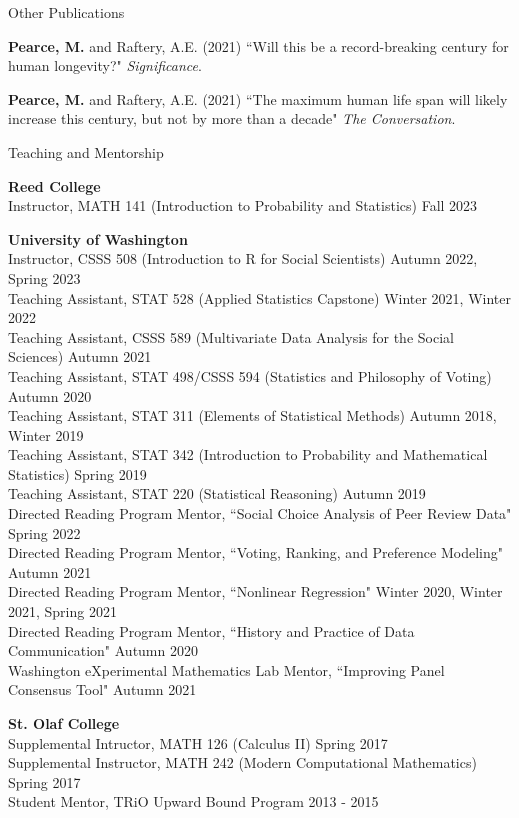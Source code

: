 \documentclass{resume} %
\begin{document}
\begin{rSection}{Other Publications}

\textbf{Pearce, M.} and Raftery, A.E. (2021) ``Will this be a record-breaking century for human longevity?" {\em Significance}.

\textbf{Pearce, M.} and Raftery, A.E. (2021) ``The maximum human life span will likely increase this century, but not by more than a decade" {\em The Conversation}.

\end{rSection}


\begin{rSection}{Teaching and Mentorship}

\textbf{Reed College}
\\ Instructor, MATH 141 (Introduction to Probability and Statistics) \hfill {Fall 2023}

\textbf{University of Washington}
\\ Instructor, CSSS 508 (Introduction to R for Social Scientists) \hfill {Autumn 2022, Spring 2023}
\\ Teaching Assistant, STAT 528 (Applied Statistics Capstone) \hfill {Winter 2021, Winter 2022}
\\ Teaching Assistant, CSSS 589 (Multivariate Data Analysis for the Social Sciences) \hfill Autumn 2021
\\ Teaching Assistant, STAT 498/CSSS 594 (Statistics and Philosophy of Voting) \hfill Autumn 2020
\\ Teaching Assistant, STAT 311 (Elements of Statistical Methods) \hfill {Autumn 2018, Winter 2019}
\\ Teaching Assistant, STAT 342 (Introduction to Probability and Mathematical Statistics) \hfill {Spring 2019}
\\ Teaching Assistant, STAT 220 (Statistical Reasoning) \hfill {Autumn 2019}
\\ Directed Reading Program Mentor, ``Social Choice Analysis of Peer Review Data" \hfill {Spring 2022}
\\ Directed Reading Program Mentor, ``Voting, Ranking, and Preference Modeling" \hfill {Autumn 2021}
\\ Directed Reading Program Mentor, ``Nonlinear Regression" \hfill {Winter 2020, Winter 2021, Spring 2021}
\\ Directed Reading Program Mentor, ``History and Practice of Data Communication" \hfill {Autumn 2020}
\\ Washington eXperimental Mathematics Lab Mentor, ``Improving Panel Consensus Tool" \hfill {Autumn 2021}

\textbf{St. Olaf College}
\\ Supplemental Intructor, MATH 126 (Calculus II) \hfill {Spring 2017}
\\ Supplemental Instructor, MATH 242 (Modern Computational Mathematics) \hfill {Spring 2017}
\\ Student Mentor, TRiO Upward Bound Program \hfill {2013 - 2015}

\end{rSection}
\end{document}

